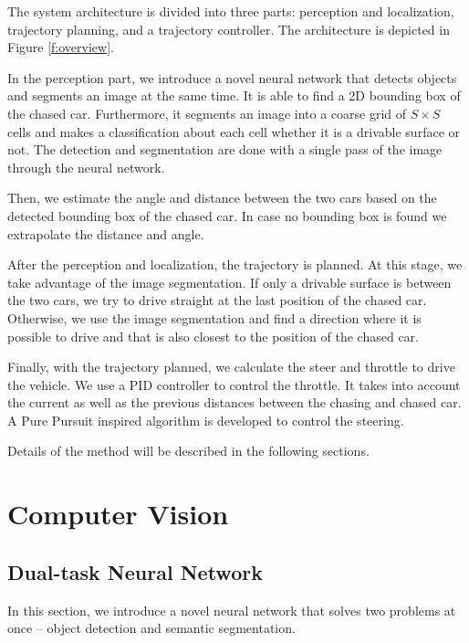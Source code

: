 \documentclass{ctuthesis/ctuthesis}
\begin{document}
The system architecture is divided into three parts: perception and localization, trajectory planning, and a trajectory controller. The architecture is depicted in Figure \ref{f:overview}. \par


In the perception part, we introduce a novel neural network that detects objects and segments an image at the same time. It is able to find a 2D bounding box of the chased car. Furthermore, it segments an image into a coarse grid of $S\times S$ cells and makes a classification about each cell whether it is a drivable surface or not. The detection and segmentation are done with a single pass of the image through the neural network. \par


Then, we estimate the angle and distance between the two cars based on the detected bounding box of the chased car. In case no bounding box is found we extrapolate the distance and angle. \par


After the perception and localization, the trajectory is planned. At this stage, we take advantage of the image segmentation. If only a drivable surface is between the two cars, we try to drive straight at the last position of the chased car. Otherwise, we use the image segmentation and find a direction where it is possible to drive and that is also closest to the position of the chased car. \par


Finally, with the trajectory planned, we calculate the steer and throttle to drive the vehicle. We use a PID controller \cite{PID_orig} to control the throttle. It takes into account the current as well as the previous distances between the chasing and chased car. A Pure Pursuit \cite{pure_pursuit_orig} inspired algorithm is developed to control the steering. \par

Details of the method will be described in the following sections.




\section{Computer Vision}
\subsection{Dual-task Neural Network}
In this section, we introduce a novel neural network that solves two problems at once -- object detection and semantic segmentation. \par
\end{document}

